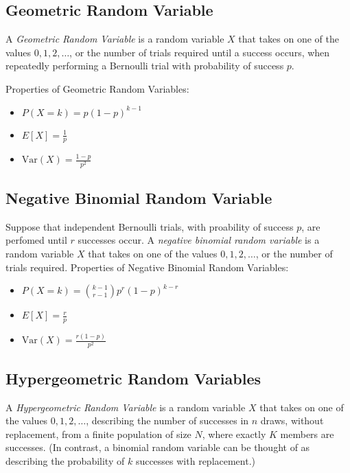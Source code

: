 \documentclass[10pt]{article}
\begin{document}
		\subsection*{Geometric Random Variable}
		A \emph{Geometric Random Variable} is a random variable $X$ that takes on one of the values $0, 1, 2, \ldots$, or the number of trials required until a success occurs, when repeatedly performing a Bernoulli trial with probability of success $p$.
		
		Properties of Geometric Random Variables:
		\begin{multicols}{3}
			\begin{itemize}
				\item $P(X=k) = p(1-p)^{k-1}$
				\item $E[X] = \frac{1}{p}$
				\item $\text{Var}(X)= \frac{1-p}{p^2} $
			\end{itemize}
		\end{multicols}
		
		\subsection*{Negative Binomial Random Variable}
		
		Suppose that independent Bernoulli trials, with proability of success $p$, are perfomed until $r$ successes occur. A \emph{negative binomial random variable} is a random variable $X$ that takes on one of the values $0, 1, 2, \ldots$, or the number of trials required.
		Properties of Negative Binomial Random Variables:
		
		\begin{multicols}{3}
			\begin{itemize}
				\item $P(X=k) = {{k-1} \choose {r-1}}p^r(1-p)^{k-r}$
				\item $E[X] = \frac{r}{p}$
				\item $\text{Var}(X)= \frac{r(1-p)}{p^2} $
			\end{itemize}
		\end{multicols}
		
		\subsection*{Hypergeometric Random Variables}
		A \emph{Hypergeometric Random Variable} is a random variable $X$ that takes on one of the values $0, 1, 2, \ldots$, describing the number of successes in $n$ draws, without replacement, from a finite population of size $N$, where exactly $K$ members are successes. (In contrast, a binomial random variable can be thought of as describing the probability of $k$ successes with replacement.)
		
\end{document}

